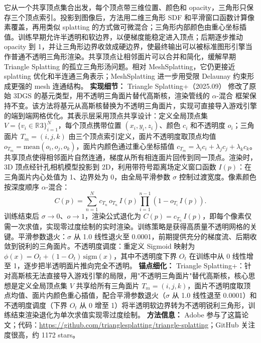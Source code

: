 它从一个共享顶点集合出发，每个顶点带三维位置、颜色和 opacity，三角形只保存三个顶点索引。投影到图像后，方法用二维三角形 SDF 和平滑窗口函数计算像素覆盖，再用类似 splatting 的方式做可微混合；三角形内部颜色由重心坐标插值。训练早期允许半透明和软边界，以便梯度能稳定进入顶点；后期逐步推动 opacity 到 1，并让三角形边界收敛成硬边界，使最终输出可以被标准图形引擎当作普通不透明三角形渲染。共享顶点让相邻面片可以合并和简化，缓解早期 Triangle Splatting 的孤立三角形汤问题。相对 MeshSplatting，它仍更接近 splatting 优化和半连通三角表示；MeshSplatting 进一步用受限 Delaunay 约束形成更强的 mesh 连通结构。
\textbf{实现细节：} Triangle Splatting+（2025.09） 修改了原始 3DGS 的基元类型，用不透明三角面片替代高斯核，渲染管线的 $\alpha$-混合 框架保持不变。该方法将基元从高斯核替换为不透明三角面片，实现可直接导入游戏引擎的端到端网格优化。其表示层采用顶点共享设计：定义全局顶点集 $V=\{v_i \in \mathbb{R}^{}3\}_{i=1}^{N}$，每个顶点携带位置 $(x_i, y_i, z_i)$、颜色 $c_i$ 和不透明度 $o_i$；三角面片 $T_m=(i,j,k)$ 由三个顶点索引定义，面片不透明度取顶点均值 $o_{T_m}=\mathrm{mean}(o_i, o_j, o_k)$，面片内颜色通过重心坐标插值 $c_{T_m}=\lambda_i c_i + \lambda_j c_j + \lambda_k c_k$。共享顶点使得相邻面片自然连通，梯度从所有相连面片回传到同一顶点。渲染时，3D 顶点经针孔相机模型投影到 2D，利用带符号距离场定义窗口函数 $I(p)$：在三角面片内心处值为 1、边界处为 0，由全局平滑参数 $\sigma$ 控制过渡宽度。像素颜色按深度顺序 $\alpha$-混合： \begin{equation*} C(p) = \sum_{n=1}^{N} c_{T_n}\, o_{T_n}\, I(p) \prod_{i=1}^{n-1}(1-o_{T_i}\, I(p)). \end{equation*} 训练结束后 $\sigma \to 0$、$o \to 1$，渲染公式退化为 $C(p) = c_{T_n}\, I(p)$，即每个像素仅需一次求值，实现零过度绘制的实时渲染。训练策略是获得高质量不透明网格的关键。平滑参数退火：$\sigma$ 从 1.0 线性退火至 0.0001，前期提供充分的梯度流、后期收敛到锐利的三角面片。不透明度调度：重定义 Sigmoid 映射为 $\phi(x) = O_t + (1-O_t)\,\mathrm{sigm}(x)$，其中不透明度下界 $O_t$ 在训练中从 0 线性增至 1，逐步把半透明面片推向完全不透明。
\textbf{锚点细化：} Triangle Splatting+：针对高斯核无法直接导入游戏引擎的局限，用"不透明三角面片"替代高斯核，核心思想是定义全局顶点集 $V$ 共享给所有三角面片 $T_m=(i,j,k)$，面片不透明度取顶点均值、面片内颜色重心插值，配合平滑参数退火（$\sigma$ 从 1.0 线性退至 0.0001）和不透明度调度（下界 $O_t$ 从 0 增至 1）将半透明软边界转为不透明锐利三角形，训练结束渲染退化为单次求值实现零过度绘制。
\textbf{方法信息：} Adobe 参与了这篇论文；代码：\url{https://github.com/trianglesplatting/triangle-splatting}；GitHub 关注度很高，约 1172 stars。



